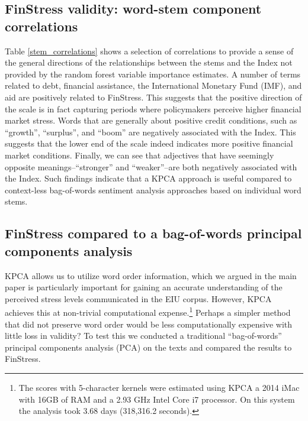 \documentclass[]{article}
\begin{document}
\subsection*{FinStress validity: word-stem component correlations}

Table \ref{stem_correlations} shows a selection of correlations to provide a sense of the general directions of the relationships between the stems and the Index not provided by the random forest variable importance estimates. A number of terms related to debt, financial assistance, the International Monetary Fund (IMF), and aid are positively related to FinStress. This suggests that the positive direction of the scale is in fact capturing periods where policymakers perceive higher financial market stress. Words that are generally about positive credit conditions, such as ``growth'', ``surplus'', and ``boom'' are negatively associated with the Index. This suggests that the lower end of the scale indeed indicates more positive financial market conditions. Finally, we can see that adjectives that have seemingly opposite meanings--``stronger'' and ``weaker''--are both negatively associated with the Index. Such findings indicate that a KPCA approach is useful compared to context-less bag-of-words sentiment analysis approaches based on individual word stems.




\subsection*{FinStress compared to a bag-of-words principal components analysis}

KPCA allows us to utilize word order information, which we argued in the main paper is particularly important for gaining an accurate understanding of the perceived stress levels communicated in the EIU corpus. However, KPCA achieves this at non-trivial computational expense.\footnote{The scores with 5-character kernels were estimated using KPCA a 2014 iMac with 16GB of RAM and a 2.93 GHz Intel Core i7 processor. On this system the analysis took 3.68 days (318,316.2 seconds).} Perhaps a simpler method that did not preserve word order would be less computationally expensive with little loss in validity? To test this we conducted a traditional ``bag-of-words'' principal components analysis (PCA) on the texts and compared the results to FinStress.
\end{document}
